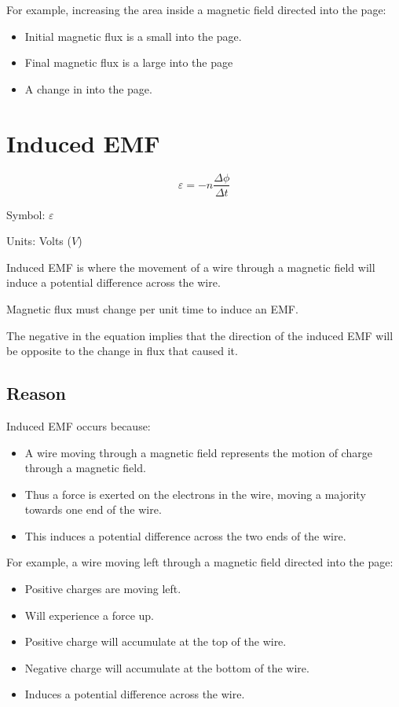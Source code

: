 \documentclass[a4paper,11pt]{article}
\begin{document}
For example, increasing the area inside a magnetic field directed into the
page:

\begin{itemize}
\item Initial magnetic flux is a small into the page.
\item Final magnetic flux is a large into the page
\item A change in into the page.
\end{itemize}




\section{Induced EMF}

$$
\varepsilon = -n \frac{\Delta \phi}{\Delta t}
$$

Symbol: $\varepsilon$

Units: Volts ($V$)

Induced EMF is where the movement of a wire through a magnetic field will induce
a potential difference across the wire.

Magnetic flux must change per unit time to induce an EMF.

The negative in the equation implies that the direction of the induced EMF will
be opposite to the change in flux that caused it.


\subsection{Reason}

Induced EMF occurs because:

\begin{itemize}
\item A wire moving through a magnetic field represents the motion of charge
	through a magnetic field.
\item Thus a force is exerted on the electrons in the wire, moving a majority
	towards one end of the wire.
\item This induces a potential difference across the two ends of the wire.
\end{itemize}

For example, a wire moving left through a magnetic field directed into the
page:

\begin{itemize}
\item Positive charges are moving left.
\item Will experience a force up.
\item Positive charge will accumulate at the top of the wire.
\item Negative charge will accumulate at the bottom of the wire.
\item Induces a potential difference across the wire.
\end{itemize}
\end{document}
